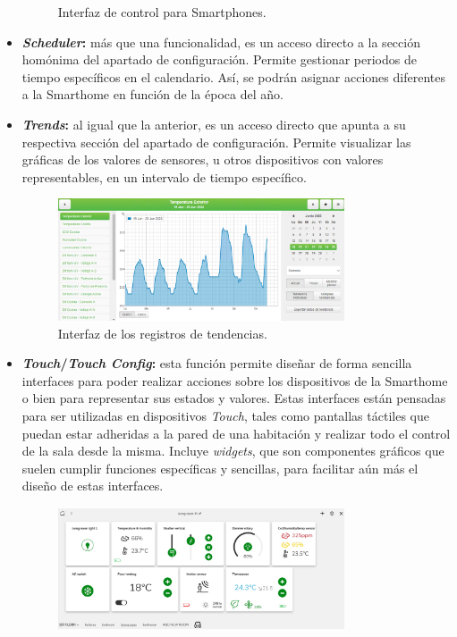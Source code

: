 \begin{itemize}
\begin{figure}[h]
        \caption{Interfaz de control para Smartphones.}
        \label{fig:interfaz_smartphones}
    \end{figure}
    \item \textbf{\textit{Scheduler}:} más que una funcionalidad, es un acceso directo a la sección homónima del apartado de configuración. Permite gestionar periodos de tiempo específicos en el calendario. Así, se podrán asignar acciones diferentes a la Smarthome en función de la época del año.
    \item \textbf{\textit{Trends}:} al igual que la anterior, es un acceso directo que apunta a su respectiva sección del apartado de configuración. Permite visualizar las gráficas de los valores de sensores, u otros dispositivos con valores representables, en un intervalo de tiempo específico.
    \begin{figure}[h]
        \centering
        \includegraphics[width=0.8\textwidth, keepaspectratio]{imagenes/capitulo3/interfazTrends.png}
        \caption{Interfaz de los registros de tendencias.}
        \label{fig:interfaz_trends}
    \end{figure}
    \item \textbf{\textit{Touch}/\textit{Touch Config}:} esta función permite diseñar de forma sencilla interfaces para poder realizar acciones sobre los dispositivos de la Smarthome o bien para representar sus estados y valores. Estas interfaces están pensadas para ser utilizadas en dispositivos \textit{Touch}, tales como pantallas táctiles que puedan estar adheridas a la pared de una habitación y realizar todo el control de la sala desde la misma. Incluye \textit{widgets}, que son componentes gráficos que suelen cumplir funciones específicas y sencillas, para facilitar aún más el diseño de estas interfaces.
    \begin{figure}[h]
        \centering
        \includegraphics[width=0.8\textwidth, keepaspectratio]{imagenes/capitulo3/interfazTouch.png}

\end{figure}
\end{itemize}
